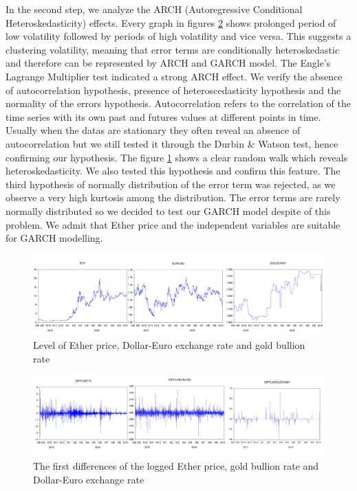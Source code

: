 \documentclass[11pt]{report}
\begin{document}
In the second step, we analyze the ARCH (Autoregressive Conditional Heteroskedasticity) effects. Every graph in figures \ref{FIG2} shows prolonged period of low volatility followed by periods of high volatility and vice versa. This suggests a clustering volatility, meaning that error terms are conditionally heteroskedastic and therefore can be represented by ARCH and GARCH model. The Engle’s Lagrange Multiplier \cite{GARCH} test indicated a strong ARCH effect. We verify the absence of autocorrelation hypothesis, presence of heteroscedasticity hypothesis and the normality of the errors hypothesis. Autocorrelation refers to the correlation of the time series with its own past and futures values at different points in time. \newline Usually when the datas are stationary they often reveal an absence of autocorrelation but we still tested it through the Durbin \& Watson test, hence confirming our hypothesis. The figure \ref{FIG1} shows a clear random walk which reveals heteroskedasticity. We also tested this hypothesis and confirm this feature. The third hypothesis of normally distribution of the error term was rejected, as we observe a very high kurtosis among the distribution. The error terms are rarely normally distributed so we decided to test our GARCH model despite of this problem. We admit that Ether price and the independent variables are suitable for GARCH modelling.

\medbreak
\begin{figure}[!h]
\caption{Level of Ether price, Dollar-Euro exchange rate and gold bullion rate}
\centerline{\includegraphics[scale=0.55]{Chap2/Figure1}}
\label{FIG1}
\end{figure}
\medbreak
\begin{figure}[!h]
\caption{The first differences of the logged Ether price, gold bullion rate and Dollar-Euro exchange rate}
\centerline{\includegraphics[scale=0.55]{Chap2/Figure2}}
\label{FIG2}
\end{figure}
\clearpage
		
\end{document}
